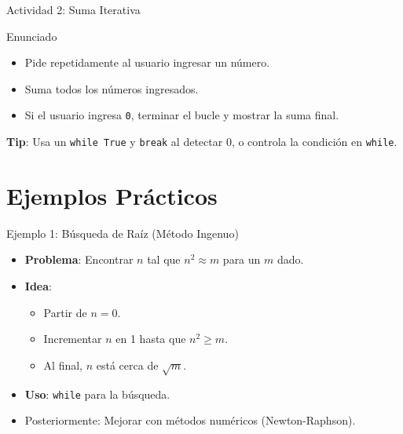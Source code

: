 \documentclass[10pt]{beamer}
\begin{document}
\begin{frame}{Actividad 2: Suma Iterativa}
  \begin{block}{Enunciado}
    \begin{itemize}
      \item Pide repetidamente al usuario ingresar un número.
      \item Suma todos los números ingresados.
      \item Si el usuario ingresa \texttt{0}, terminar el bucle y mostrar la suma final.
    \end{itemize}
  \end{block}
  \textbf{Tip}: Usa un \texttt{while True} y \texttt{break} al detectar 0, o controla la condición en \texttt{while}.
\end{frame}

\section{Ejemplos Prácticos}

\begin{frame}{Ejemplo 1: Búsqueda de Raíz (Método Ingenuo)}
  \begin{itemize}
    \item \textbf{Problema}: Encontrar \(n\) tal que \(n^2 \approx m\) para un \(m\) dado.
    \item \textbf{Idea}:
      \begin{itemize}
        \item Partir de \(n=0\).
        \item Incrementar \(n\) en 1 hasta que \(n^2 \ge m\).
        \item Al final, \(n\) está cerca de \(\sqrt{m}\).
      \end{itemize}
    \item \textbf{Uso}: \texttt{while} para la búsqueda.
    \item Posteriormente: Mejorar con métodos numéricos (Newton-Raphson).
  \end{itemize}
\end{frame}
\end{document}
